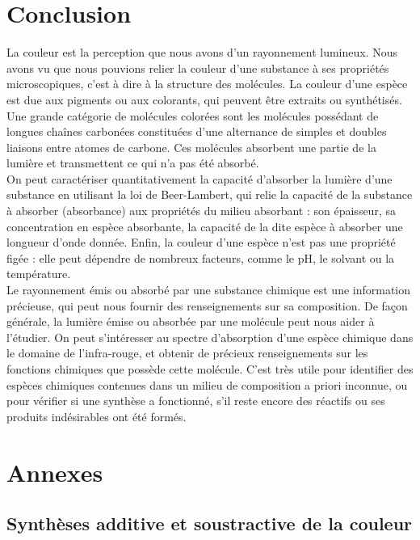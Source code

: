 \documentclass[11pt,a4paper]{report}
\begin{document}
\newpage
\section*{Conclusion}

La couleur est la perception que nous avons d'un rayonnement lumineux. Nous avons vu que nous pouvions relier la couleur d'une substance à ses propriétés microscopiques, c'est à dire à la structure des molécules. La couleur d'une espèce est due aux pigments ou aux colorants, qui peuvent être extraits ou synthétisés. Une grande catégorie de molécules colorées sont les molécules possédant de longues chaînes carbonées constituées d'une alternance de simples et doubles liaisons entre atomes de carbone. Ces molécules absorbent une partie de la lumière et transmettent ce qui n'a pas été absorbé.\\

On peut caractériser quantitativement la capacité d'absorber la lumière d'une substance en utilisant la loi de Beer-Lambert, qui relie la capacité de la substance à absorber (absorbance) aux propriétés du milieu absorbant : son épaisseur, sa concentration en espèce absorbante, la capacité de la dite espèce à absorber une longueur d'onde donnée. Enfin, la couleur d'une espèce n'est pas une propriété figée : elle peut dépendre de nombreux facteurs, comme le pH, le solvant ou la température.\\ 

Le rayonnement émis ou absorbé par une substance chimique est une information précieuse, qui peut nous fournir des renseignements sur sa composition. De façon générale, la lumière émise ou absorbée par une molécule peut nous aider à l'étudier. On peut s'intéresser au spectre d'absorption d'une espèce chimique dans le domaine de l'infra-rouge, et obtenir de précieux renseignements sur les fonctions chimiques que possède cette molécule. C'est très utile pour identifier des espèces chimiques contenues dans un milieu de composition a priori inconnue, ou pour vérifier si une synthèse a fonctionné, s'il reste encore des réactifs ou ses produits indésirables ont été formés.

\newpage
\section*{Annexes}
\subsection*{Synthèses additive et soustractive de la couleur}
\end{document}
